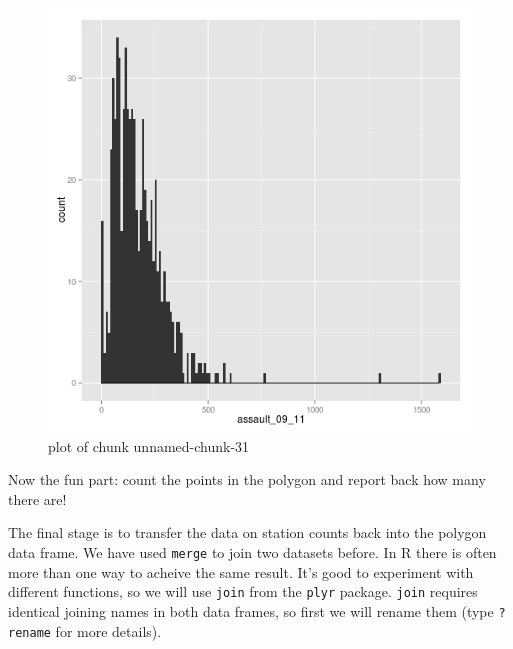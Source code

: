 \documentclass[]{article}
\makeatletter
\newenvironment{Shaded}{}{}
\newcommand{\KeywordTok}[1]{\textcolor[rgb]{0.00,0.44,0.13}{\textbf{{#1}}}}
\newcommand{\StringTok}[1]{\textcolor[rgb]{0.25,0.44,0.63}{{#1}}}
\newcommand{\NormalTok}[1]{{#1}}
\def\maxwidth{\ifdim\Gin@nat@width>\linewidth\linewidth
\else\Gin@nat@width\fi}
\let\Oldincludegraphics\includegraphics
\renewcommand{\includegraphics}[1]{\Oldincludegraphics[width=\maxwidth]{#1}}
\makeatother
\begin{document}
\begin{Shaded}
\end{Shaded}
\begin{figure}[htbp]
\centering
\includegraphics{figure/unnamed-chunk-31.png}
\caption{plot of chunk unnamed-chunk-31}
\end{figure}

Now the fun part: count the points in the polygon and report back how
many there are!

The final stage is to transfer the data on station counts back into the
polygon data frame. We have used \texttt{merge} to join two datasets
before. In R there is often more than one way to acheive the same
result. It's good to experiment with different functions, so we will use
\texttt{join} from the \texttt{plyr} package. \texttt{join} requires
identical joining names in both data frames, so first we will rename
them (type \texttt{?rename} for more details).
\end{document}
